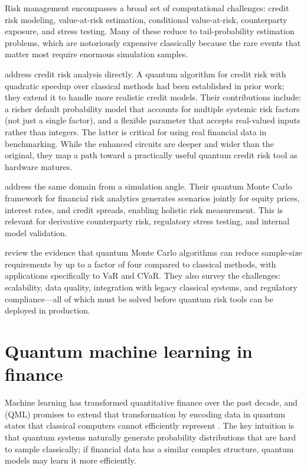 Risk management encompasses a broad set of computational challenges: credit risk modeling, value-at-risk estimation, conditional value-at-risk, counterparty exposure, and stress testing. Many of these reduce to tail-probability estimation problems, which are notoriously expensive classically because the rare events that matter most require enormous simulation samples.

\citet{dri_towards_2022} address credit risk analysis directly. A quantum algorithm for credit risk with quadratic speedup over classical methods had been established in prior work; they extend it to handle more realistic credit models. Their contributions include: a richer default probability model that accounts for multiple systemic risk factors (not just a single factor), and a flexible  parameter that accepts real-valued inputs rather than integers. The latter is critical for using real financial data in benchmarking. While the enhanced circuits are deeper and wider than the original, they map a path toward a practically useful quantum credit risk tool as hardware matures.

\citet{matsakos_quantum_2024} address the same domain from a simulation angle. Their quantum Monte Carlo framework for financial risk analytics generates scenarios jointly for equity prices, interest rates, and credit spreads, enabling holistic risk measurement. This is relevant for derivative counterparty risk, regulatory stress testing, and internal model validation.

\citet{zhou_quantum_2026} review the evidence that quantum Monte Carlo algorithms can reduce sample-size requirements by up to a factor of four compared to classical methods, with applications specifically to VaR and CVaR. They also survey the challenges: scalability, data quality, integration with legacy classical systems, and regulatory compliance---all of which must be solved before quantum risk tools can be deployed in production.

\section{Quantum machine learning in finance}

Machine learning has transformed quantitative finance over the past decade, and  (QML) promises to extend that transformation by encoding data in quantum states that classical computers cannot efficiently represent \citep{biamonte_quantum_2017}. The key intuition is that quantum systems naturally generate probability distributions that are hard to sample classically; if financial data has a similar complex structure, quantum models may learn it more efficiently.

